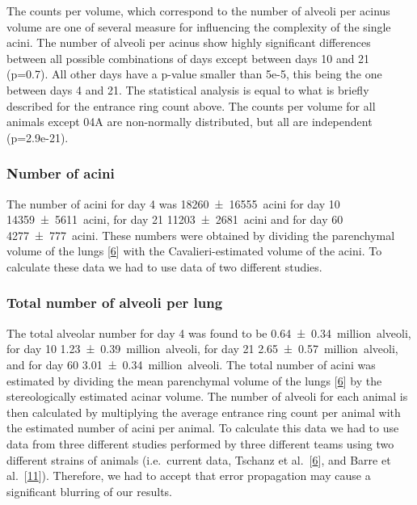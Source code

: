 \documentclass[
  american,
]{article}
\begin{document}
The counts per volume, which correspond to the number of alveoli per acinus volume are one of several measure for influencing the complexity of the single acini.
The number of alveoli per acinus show highly significant differences between all possible combinations of days except between days 10 and 21 (p=0.7).
All other days have a p-value smaller than 5e-5, this being the one between days 4 and 21.
The statistical analysis is equal to what is briefly described for the entrance ring count above.
The counts per volume for all animals except 04A are non-normally distributed, but all are independent (p=2.9e-21).

\hypertarget{number-of-acini}{%
\subsubsection{Number of acini}\label{number-of-acini}}

The number of acini for day 4 was 18260~±~16555~acini for day 10 14359~±~5611~acini, for day 21 11203~±~2681~acini and for day 60 4277~±~777~acini.
These numbers were obtained by dividing the parenchymal volume of the lungs {[}\protect\hyperlink{ref-wnl86DEM}{6}{]} with the Cavalieri-estimated volume of the acini.
To calculate these data we had to use data of two different studies.

\hypertarget{total-number-of-alveoli-per-lung}{%
\subsubsection{Total number of alveoli per lung}\label{total-number-of-alveoli-per-lung}}

The total alveolar number for day 4 was found to be 0.64~±~0.34~million~alveoli, for day 10 1.23~±~0.39~million~alveoli, for day 21 2.65~±~0.57~million~alveoli, and for day 60 3.01~±~0.34~million~alveoli.
The total number of acini was estimated by dividing the mean parenchymal volume of the lungs {[}\protect\hyperlink{ref-wnl86DEM}{6}{]} by the stereologically estimated acinar volume.
The number of alveoli for each animal is then calculated by multiplying the average entrance ring count per animal with the estimated number of acini per animal.
To calculate this data we had to use data from three different studies performed by three different teams using two different strains of animals (i.e.~current data, Tschanz et al.~{[}\protect\hyperlink{ref-wnl86DEM}{6}{]}, and Barre et al.~{[}\protect\hyperlink{ref-uFNlWogb}{11}{]}).
Therefore, we had to accept that error propagation may cause a significant blurring of our results.
\end{document}
